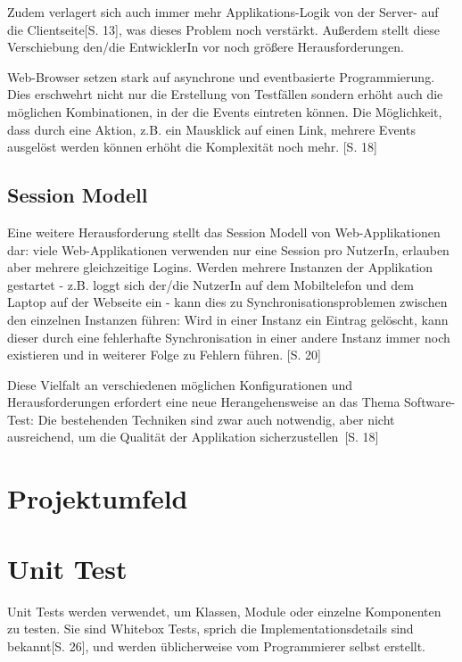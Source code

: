 \documentclass[a4paper,bibtotoc,oneside]{scrbook}
\begin{document}
Zudem verlagert sich auch immer mehr Applikations-Logik von der Server- auf die Clientseite\cite{testing_apps_on_web}[S. 13], was dieses Problem noch verstärkt. Außerdem stellt diese Verschiebung den/die EntwicklerIn vor noch größere Herausforderungen.

Web-Browser setzen stark auf asynchrone und eventbasierte Programmierung. Dies erschwehrt nicht nur die Erstellung von Testfällen sondern erhöht auch die möglichen Kombinationen, in der die Events eintreten können. Die Möglichkeit, dass durch eine Aktion, z.B. ein Mausklick auf einen Link, mehrere Events ausgelöst werden können erhöht die Komplexität noch mehr. \cite{testing_apps_on_web}[S. 18]

\section{Session Modell}
Eine weitere Herausforderung stellt das Session Modell von Web-Applikationen dar: viele Web-Applikationen verwenden nur eine Session pro NutzerIn, erlauben aber mehrere gleichzeitige Logins. Werden mehrere Instanzen der Applikation gestartet - z.B. loggt sich der/die NutzerIn auf dem Mobiltelefon und dem Laptop auf der Webseite ein - kann dies zu Synchronisationsproblemen zwischen den einzelnen Instanzen führen: Wird in einer Instanz ein Eintrag gelöscht, kann dieser durch eine fehlerhafte Synchronisation in einer andere Instanz immer noch existieren und in weiterer Folge zu Fehlern führen. \cite{testing_apps_on_web}[S. 20]

Diese Vielfalt an verschiedenen möglichen Konfigurationen und Herausforderungen erfordert eine neue Herangehensweise an das Thema Software-Test: Die bestehenden Techniken sind \glqq zwar auch notwendig, aber nicht ausreichend, um die Qualität der Applikation sicherzustellen\grqq\ \cite{eval_automat_webapp_test}[S. 18]


\chapter{Projektumfeld}


\chapter{Unit Test}
Unit Tests werden verwendet, um Klassen, Module oder einzelne Komponenten zu testen. Sie sind Whitebox Tests, sprich die Implementationsdetails sind bekannt\cite{betrieb}[S. 26], und werden üblicherweise vom Programmierer selbst erstellt. 
\end{document}

